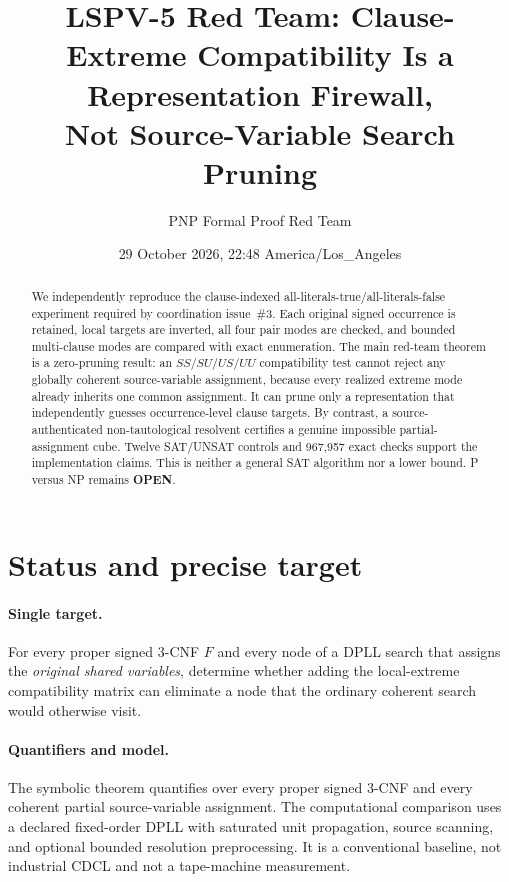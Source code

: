 \documentclass[10pt]{article}
\title{LSPV-5 Red Team: Clause-Extreme Compatibility Is a Representation Firewall,\\Not Source-Variable Search Pruning}
\author{PNP Formal Proof Red Team}
\date{29 October 2026, 22:48 America/Los\_Angeles}
\newcommand{\OPEN}{\textbf{OPEN}}
\begin{document}
\maketitle

\begin{abstract}
We independently reproduce the clause-indexed all-literals-true/all-literals-false
experiment required by coordination issue~\#3.  Each original signed occurrence is
retained, local targets are inverted, all four pair modes are checked, and bounded
multi-clause modes are compared with exact enumeration.  The main red-team theorem
is a zero-pruning result: an $SS/SU/US/UU$ compatibility test cannot reject any
globally coherent source-variable assignment, because every realized extreme mode
already inherits one common assignment.  It can prune only a representation that
independently guesses occurrence-level clause targets.  By contrast, a
source-authenticated non-tautological resolvent certifies a genuine impossible
partial-assignment cube.  Twelve SAT/UNSAT controls and 967,957 exact checks support
the implementation claims.  This is neither a general SAT algorithm nor a lower
bound.  P versus NP remains \OPEN.
\end{abstract}

\section{Status and precise target}

\paragraph{Single target.}
For every proper signed 3-CNF $F$ and every node of a DPLL search that assigns the
\emph{original shared variables}, determine whether adding the local-extreme
compatibility matrix can eliminate a node that the ordinary coherent search would
otherwise visit.

\paragraph{Quantifiers and model.}
The symbolic theorem quantifies over every proper signed 3-CNF and every coherent
partial source-variable assignment.  The computational comparison uses a declared
fixed-order DPLL with saturated unit propagation, source scanning, and optional
bounded resolution preprocessing.  It is a conventional baseline, not industrial
CDCL and not a tape-machine measurement.
\end{document}
